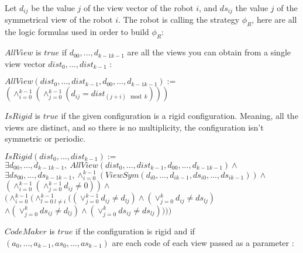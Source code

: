 \documentclass{article}
\begin{document}
Let $d_{ij}$ be the value $j$ of the view vector of the robot $i$, and $ds_{ij}$ the value $j$ of the symmetrical 
view of the robot $i$.
The robot is calling the strategy $\phi_R$, here are all the logic formulas used in order to build $\phi_R$:

$AllView$ is $true$ if $d_{00}, ...,d_{k-1k-1}$ are all the views you can obtain from a single view vector $dist_{0}, ...,dist_{k-1}$ :

\begin{center}
    
$AllView(dist_{0}, ...,dist_{k-1}, d_{00}, ...,d_{k-1k-1}):=$\\
$(\land_{i=0}^{k-1} (\land_{j=0}^{k-1} (d_{ij} = dist_{(j+i) \mod{k}}) ) )$
\end{center}

$IsRigid$ is $true$ if the given configuration is a rigid configuration. Meaning, all the views are distinct, and so there is no multiplicity, the configuration isn't symmetric or periodic.

\begin{center}

$IsRigid(dist_{0}, ...,dist_{k-1}):=$\\
$\exists d_{00}, ...,d_{k-1k-1},\ AllView(dist_{0}, ...,dist_{k-1}, d_{00}, ...,d_{k-1k-1})\land$\\
$\exists ds_{00}, ...,ds_{k-1k-1}, \land_{i=0}^{k-1} (ViewSym(d_{i0}, ..., d_{ik-1}, ds_{i0}, ..., ds_{ik-1}))\land$\\
$(\land_{i=0}^{k-1}(\land_{j=0}^{k-1}d_{ij}\not=0))\land $\\%
$( \land_{i=0}^{k-1}(
\land_{l=0\ l\not=i}^{k-1}(
(\lor_{j=0}^{k-1}d_{ij} \not= d_{lj})
\land (\lor_{j=0}^{k}d_{ij} \not= ds_{lj})$\\
$\land (\lor_{j=0}^{k}ds_{ij} \not= d_{lj})
\land (\lor_{j=0}^{k}ds_{ij} \not= ds_{lj})
) ))$\\%
\end{center}

$CodeMaker$ is $true$ if the configuration is rigid and if $(a_{0}, ..., a_{k-1}, as_{0}, ..., as_{k-1})$ are each code of each view passed as a parameter :
\end{document}

